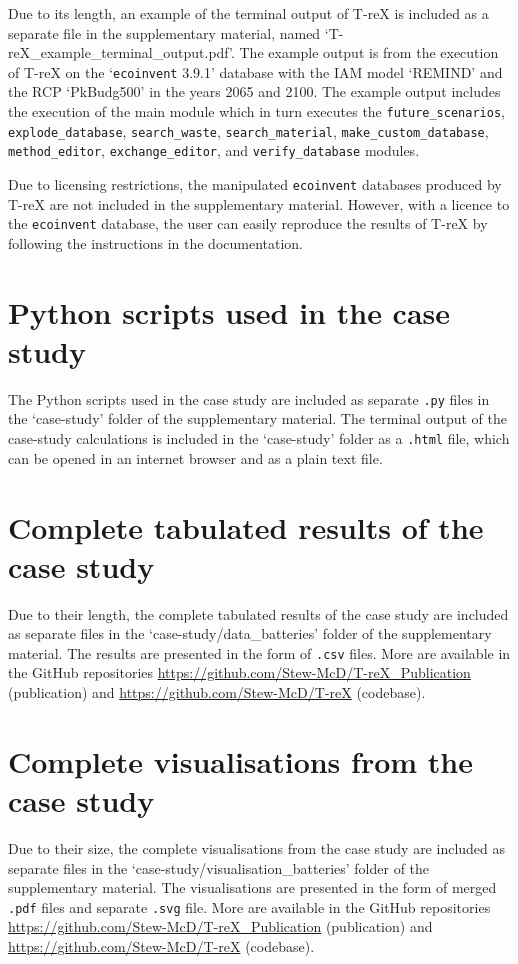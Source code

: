 \documentclass{article}
\renewcommand{\texttt}[1]{{\ttfamily\small\nolinkurl{#1}}}
\begin{document}
Due to its length, an example of the terminal output of T-reX is included as a separate file in the supplementary material, named `T-reX\_example\_terminal\_output.pdf'. The example output is from the execution of T-reX on the `\texttt{ecoinvent} 3.9.1' database with the IAM model `REMIND' and the RCP `PkBudg500' in the years 2065 and 2100. The example output includes the execution of the main module which in turn executes the \texttt{future\_scenarios}, \texttt{explode\_database}, \texttt{search\_waste}, \texttt{search\_material}, \texttt{make\_custom\_database}, \texttt{method\_editor}, \texttt{exchange\_editor}, and \texttt{verify\_database} modules.

Due to licensing restrictions, the manipulated \texttt{ecoinvent} databases produced by T-reX are not included in the supplementary material. However, with a licence to the \texttt{ecoinvent} database, the user can easily reproduce the results of T-reX by following the instructions in the documentation.

\clearpage


\section{Python scripts used in the case study}

The Python scripts used in the case study are included as separate \texttt{.py} files in the `case-study' folder of the supplementary material. The terminal output of the case-study calculations is included in the `case-study' folder as a \texttt{.html} file, which can be opened in an internet browser and as a plain text file.

\clearpage
\section{Complete tabulated results of the case study}

Due to their length, the complete tabulated results of the case study are included as separate files in the `case-study/data\_batteries' folder of the supplementary material. The results are presented in the form of \texttt{.csv} files. More are available in the GitHub repositories \url{https://github.com/Stew-McD/T-reX_Publication} (publication) and \url{https://github.com/Stew-McD/T-reX} (codebase).


\clearpage

\section{Complete visualisations from the case study}

Due to their size, the complete visualisations from the case study are included as separate files in the `case-study/visualisation\_batteries' folder of the supplementary material. The visualisations are presented in the form of merged \texttt{.pdf} files and separate \texttt{.svg} file. More are available in the GitHub repositories \url{https://github.com/Stew-McD/T-reX_Publication} (publication) and \url{https://github.com/Stew-McD/T-reX} (codebase).

\clearpage



\end{document}
